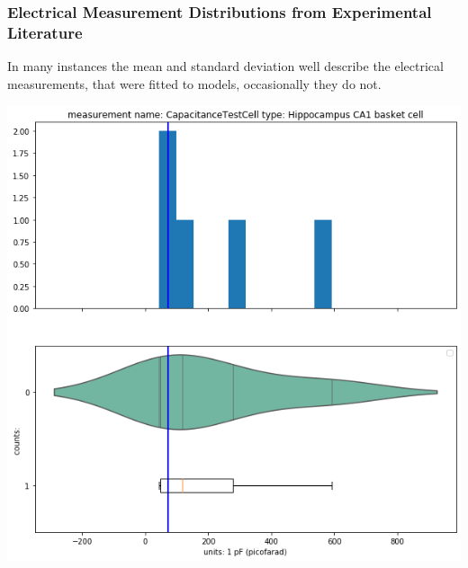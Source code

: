 \subsubsection{Electrical Measurement Distributions from Experimental Literature}%
In many instances the mean and standard deviation well describe the electrical measurements, that were fitted to models, occasionally they do not.    



    


    \begin{center}
    \includegraphics[width=0.7\linewidth]{notebooks_converted/needata_thesis_files/needata_thesis_5_4}
    \end{center}

